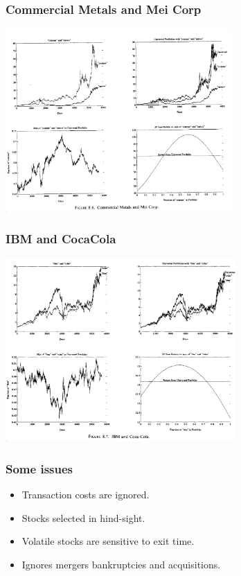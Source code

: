 \documentclass{beamer}
\begin{document}
\begin{small}
\begin{frame}
\frametitle{Commercial Metals and Mei Corp}
\includegraphics[height=7cm]{figures/CommercialMetals&MeiCorp.png}
\end{frame}

\begin{frame}
\frametitle{IBM and CocaCola}
\includegraphics[height=7cm]{figures/IBM&CocaCola.png}
\end{frame}

\begin{frame}
  \frametitle{Some issues}
  \begin{itemize}
  \item Transaction costs are ignored.
  \item Stocks selected in hind-sight.
  \item Volatile stocks are sensitive to exit time.
  \item Ignores mergers bankruptcies and acquisitions.
  \end{itemize}
\end{frame}

\iffalse

\end{small}
\end{document}
